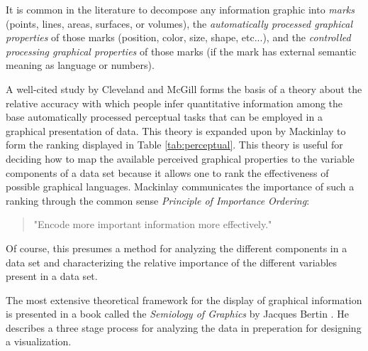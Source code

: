 It is common in the literature to decompose any information graphic into \emph{marks} (points, lines, areas, surfaces, or volumes), the \emph{automatically processed graphical properties} of those marks (position, color, size, shape, etc...), and the \emph{controlled processing graphical properties} of those marks (if the mark has external semantic meaning as language or numbers). 

A well-cited study by Cleveland and McGill \cite{cleveland1984} forms the basis of a theory about the relative accuracy with which people infer quantitative information among the base automatically processed perceptual tasks that can be employed in a graphical presentation of data. This theory is expanded upon by Mackinlay \cite{jock1986} to form the ranking displayed in Table \ref{tab:perceptual}. This theory is useful for deciding how to map the available perceived graphical properties to the variable components of a data set because it allows one to rank the effectiveness of possible graphical languages. Mackinlay communicates the importance of such a ranking through the common sense \emph{Principle of Importance Ordering}:

\begin{quote}
"Encode more important information more effectively." \cite{jock1986}
\end{quote}

\begin{comment}
The Structure of the Information Visualization Design Space, Section 2 
controlled vs. automatic processing
connection

Visual Information Seeking: Tight Coupling of Dynamic Query Filters with Starfield Displays
\end{comment}

Of course, this presumes a method for analyzing the different components in a data set and characterizing the relative importance of the different variables present in a data set.

The most extensive theoretical framework for the display of graphical information is presented in a book called the \emph{Semiology of Graphics} by Jacques Bertin \cite{semiology1983}. He describes a three stage process for analyzing the data in preperation for designing a visualization.

